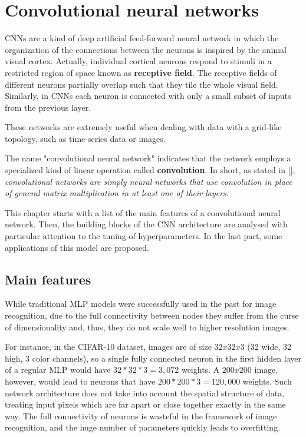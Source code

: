 \chapter{Convolutional neural networks}\label{ch:conv_nets}

\acp{CNN} are a kind of deep artificial feed-forward neural network in which the organization of the connections between the neurons is inspired by the animal visual cortex. Actually, individual cortical neurons respond to stimuli in a restricted region of space known as \textbf{receptive field}. The receptive fields of different neurons partially overlap such that they tile the whole visual field. Similarly, in \acp{CNN} each neuron is connected with only a small subset of inputs from the previous layer.

These networks are extremely useful when dealing with data with a grid-like topology, such as time-series data or images.

The name "convolutional neural network" indicates that the network employs a specialized kind of linear operation called \textbf{convolution}. In short, as stated in [\cite{Goodfellow-et-al-2016}], \emph{convolutional networks are simply neural networks that use convolution in place of general matrix multiplication in at least one of their layers}.

This chapter starts with a list of the main features of a convolutional neural network. Then, the building blocks of the \ac{CNN} architecture are analysed with particular attention to the tuning of hyperparameters. In the last part, some applications of this model are proposed.

\section{Main features}

While traditional \acf{MLP} models were successfully used in the past for image recognition, due to the full connectivity between nodes they suffer from the curse of dimensionality and, thus, they do not scale well to higher resolution images.

For instance, in the CIFAR-10 dataset, images are of size $32x32x3$ (32 wide, 32 high, 3 color channels), so a single fully connected neuron in the first hidden layer of a regular \ac{MLP} would have $32*32*3 = 3,072$ weights. A $200x200$ image, however, would lead to neurons that have $200*200*3 = 120,000$ weights.
Such network architecture does not take into account the spatial structure of data, treating input pixels which are far apart or close together exactly in the same way. The full connectivity of neurons is wasteful in the framework of image recognition, and the huge number of parameters quickly leads to overfitting.

